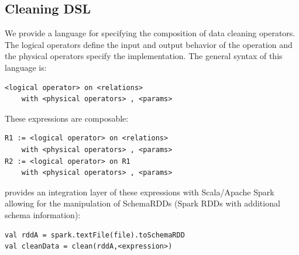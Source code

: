 \subsection{Cleaning DSL}
\label{sec:dsl}
We provide a language for specifying the composition of data cleaning operators.
The logical operators define the input and output behavior of the operation and 
the physical operators specify the implementation.
The general syntax of this language is:
\begin{lstlisting}
<logical operator> on <relations>
	with <physical operators> , <params>
\end{lstlisting}

These expressions are composable:
\begin{lstlisting}
R1 := <logical operator> on <relations> 
	with <physical operators> , <params>
R2 := <logical operator> on R1 
	with <physical operators> , <params>
\end{lstlisting}
\projx provides an integration layer of these expressions with Scala/Apache Spark allowing for the manipulation of SchemaRDDs (Spark RDDs with additional schema information):
\begin{lstlisting}
val rddA = spark.textFile(file).toSchemaRDD
val cleanData = clean(rddA,<expression>)
\end{lstlisting}







